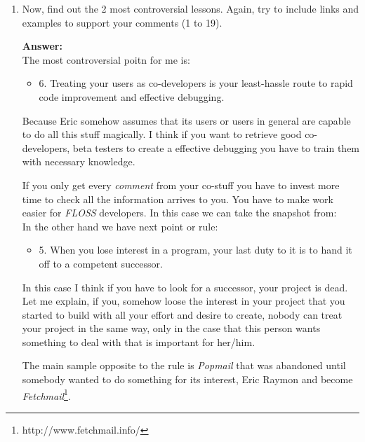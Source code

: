 \documentclass[11pt]{scrartcl}
\begin{document}
\begin{enumerate}
			\indent A sample of spread code could be \emph{Android SDK}\footnote{http://source.android.com/source/downloading.html}. I know, Google only release source code when he wants, but this is not the question, is how code release help your development increases capabilities, gets strong and it's used for more and more people and therefore your beta-tester 'database' increases everyday.\\
			
		\item Now, find out the 2 most controversial lessons. Again, try to include links and examples to support your comments (1 to 19).

			\textbf{Answer:}\\
			
			The most controversial poitn for me is:
			
			\begin{itemize}
			
				\item 6. Treating your users as co-developers is your least-hassle route to rapid code improvement and effective debugging.
			\end{itemize}
			
			Because Eric somehow assumes that its users or users in general are capable to do all this stuff magically. I think if you want to retrieve good co-developers, beta testers to create a effective debugging you have to train them with necessary knowledge. 
			
			If you only get every \emph{comment} from your co-stuff you have to invest more time to check all the information arrives to you. You have to make work easier for \emph{FLOSS} developers. In this case we can take the snapshot from: \\
			
			In the other hand we have next point or rule:
			
			\begin{itemize}
			
				\item 5. When you lose interest in a program, your last duty to it is to hand it off to a competent successor.
			\end{itemize}
			
			In this case I think if you have to look for a successor, your project is dead. Let me explain, if you, somehow loose the interest in your project that you started to build with all your effort and desire to create, nobody can treat your project in the same way, only in the case that this person wants something to deal with that is important for her/him.
			
			The main sample opposite to the rule is \emph{Popmail} that was abandoned until somebody wanted to do something for its interest, Eric Raymon and become \emph{Fetchmail}\footnote{http://www.fetchmail.info/}.
			
	\end{enumerate}
\end{document}
